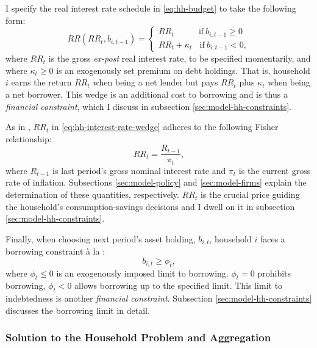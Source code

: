 \documentclass[a4paper,12pt]{article} %
\numberwithin{equation}{section} %
\numberwithin{figure}{section}
\numberwithin{table}{section}
\begin{document}
I specify the real interest rate schedule in \eqref{eq:hh-budget} to take the following form:
\begin{equation}
    RR (RR_t, b_{i,t-1}) = \begin{cases}
	RR_t \ \ \ \ \ \ \ \ \ \ \ \ \ \text{if} \ b_{i,t-1} \ge 0 \\
	RR_t + \kappa_t \ \ \ \ \text{if} \ b_{i,t-1} < 0,
	\end{cases} \label{eq:hh-interest-rate-wedge}
\end{equation}
where $RR_t$ is the gross \textit{ex-post} real interest rate, to be specified momentarily, and where $\kappa_t \ge 0$ is an exogenously set premium on debt holdings. That is, household $i$ earns the return $RR_t$ when being a net lender but pays $RR_t$ plus $\kappa_t$ when being a net borrower. This wedge is an additional cost to borrowing and is thus a \textit{financial constraint}, which I discuss in subsection \ref{sec:model-hh-constraints}.

As in \textcite{auclert2021}, $RR_t$ in \eqref{eq:hh-interest-rate-wedge} adheres to the following Fisher relationship:
\begin{equation}
    RR_t = \frac{R_{t-1}}{\pi_t}, \label{eq:hh-fisher-equation}
\end{equation}
where $R_{t-1}$ is last period's gross nominal interest rate and $\pi_t$ is the current gross rate of inflation. Subsections \ref{sec:model-policy} and \ref{sec:model-firms} explain the determination of these quantities, respectively. $RR_t$ is the crucial price guiding the household's consumption-savings decisions and I dwell on it in subsection \ref{sec:model-hh-constraints}.

Finally, when choosing next period's asset holding, $b_{i,t}$, household $i$ faces a borrowing constraint à la \textcite{huggett1993}:
\begin{equation}
    b_{i,t} \ge \phi_t, \label{eq:borrowing-limit}
\end{equation}
where $\phi_t \le 0$ is an exogenously imposed limit to borrowing. $\phi_t = 0$ prohibits borrowing, $\phi_t < 0$ allows borrowing up to the specified limit. This limit to indebtedness is another \textit{financial constraint}. Subsection \ref{sec:model-hh-constraints} discusses the borrowing limit in detail.

\subsubsection{Solution to the Household Problem and Aggregation}
\label{sec:model-hh-solution}
\end{document}
